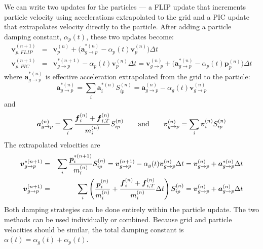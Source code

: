 \documentclass[11pt]{article}
\renewcommand{\vec}[1]{\boldsymbol{#1}}
\begin{document}
We can write two updates  for the particles --- a FLIP update that increments particle velocity using accelerations extrapolated to the grid and a PIC update that extrapolates velocity directly to the particle. After adding a particle damping constant, $\alpha_p(t)$, these two updates become:
\begin{eqnarray}
      \vec{v}_{p,FLIP}^{(n+1)}  & = & \vec{v}_p^{(n)} + \bigl(\vec{a}_{g\to p}^{*(n)}  -  \alpha_p(t)\vec{v}_p^{(n)} \bigr)\Delta t   \\
      \vec{v}_{p,PIC}^{(n+1)}  & = & \vec v_{g\to p}^{*(n+1)} - \alpha_p(t)\vec{v}_p^{(n)}\Delta t
           = \vec v_{g\to p}^{(n)} + \bigl(\vec{a}_{g\to p}^{*(n)}  -  \alpha_p(t)\vec{p}_p^{(n)}\bigr)\Delta t 
\end{eqnarray}
where $\vec{a}_{g\to p}^{*(n)}$ is effective acceleration extrapolated from the grid to the particle:
\begin{equation}
    \vec{a}_{g\to p}^{*(n)} = \sum_i  \vec a_i^{*(n)} S_{ip}^{(n)} = \vec{a}_{g\to p}^{(n)} -  \alpha_g(t)\vec v_{g\to p}^{(n)}   
\end{equation}
and
\begin{equation}
    \vec{a}_{g\to p}^{(n)} = \sum_i { \vec f_{i}^{(n)} + \vec f_{i,T}^{(n)} \over m_i^{(n)}} S_{ip}^{(n)}    
    \qquad {\rm and}\qquad \vec v_{g\to p}^{(n)} = \sum_i  \vec v_i^{(n)} S_{ip}^{(n)}
\end{equation}
The extrapolated velocities are
\begin{eqnarray}
      \vec v_{g\to p}^{*(n+1)} & = & \sum_i  {\vec p_i^{*(n+1)} \over m_i^{(n)}}S_{ip}^{(n)}
       = \vec v_{g\to p}^{(n+1)} - \alpha_g(t)\vec v_{g\to p}^{(n)}\Delta t  = \vec v_{g\to p}^{(n)} + \vec{a}_{g\to p}^{*(n)}\Delta t  \\ 
       \vec v_{g\to p}^{(n+1)} & = & 
          \sum_i  \left({\vec p_i^{(n)} \over m_i^{(n)}}+{ \vec f_{i}^{(n)} + \vec f_{i,T}^{(n)} \over m_i^{(n)}}\Delta t\right) S_{ip}^{(n)} 
          = \vec v_{g\to p}^{(n)} + \vec{a}_{g\to p}^{(n)}\Delta t  \label{vgpJump}
\end{eqnarray}
Both damping strategies can be done entirely within the particle update. The two methods can be used individually or combined. Because grid and particle velocities should be similar, the total damping constant is $\alpha(t)=\alpha_g(t)+\alpha_p(t)$.
\end{document}
